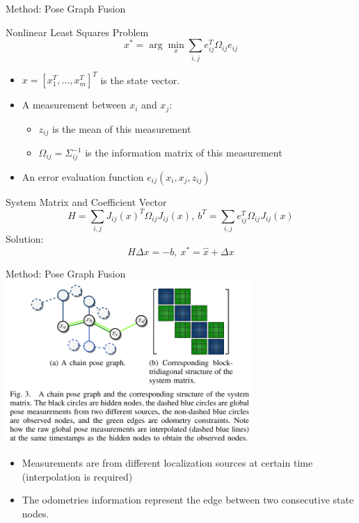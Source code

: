 \documentclass[10pt]{beamer}
\begin{document}
	\begin{frame}{Method: Pose Graph Fusion}
		\begin{block}{Nonlinear Least Squares Problem}
			$$x^*=\arg\min_x{\sum_{i,j}e_{ij}^T\Omega_{ij}e_{ij}}$$
			\begin{itemize}
				\item $x=[x_1^T,\dots,x_m^T]^T$ is the state vector.
				\item A measurement between $x_i$ and $x_j$:
				\begin{itemize}
					\item $z_{ij}$ is the mean of this measurement
					\item $\Omega_{ij}=\Sigma_{ij}^{-1}$ is the information matrix of this measurement
				\end{itemize}
				\item An error evaluation function $e_{ij}(x_i,x_j,z_{ij})$
			\end{itemize}
			System Matrix and Coefficient Vector
			$$H=\sum_{i,j}{J_{ij}(x)^T\Omega_{ij}J_{ij}(x)},~b^T=\sum_{i,j}e_{ij}^T\Omega_{ij}J_{ij}(x)$$
			Solution:
			$$H\Delta x=-b,~x^*=\hat{x}+\Delta x$$
		\end{block}
	\end{frame}

	\begin{frame}{Method: Pose Graph Fusion}
		\centering
		\includegraphics[width=0.7\textwidth]{./img/posegraph.png}
		\begin{itemize}
			\item Measurements are from different localization sources at certain time (interpolation is required)
			\item The odometries information represent the edge between two consecutive state nodes.
		\end{itemize}
	\end{frame}
\end{document}
